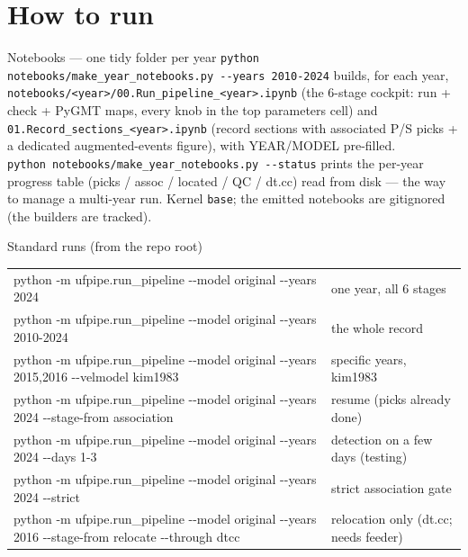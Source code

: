 \documentclass[11pt]{article}
\newcommand{\code}[1]{\texttt{#1}}
\begin{document}
\section{How to run}

\begin{keybox}{Notebooks --- one tidy folder per year}
\code{python notebooks/make\_year\_notebooks.py -{}-years 2010-2024} builds, for each year,
\code{notebooks/<year>/00.Run\_pipeline\_<year>.ipynb} (the 6-stage cockpit: run + check + PyGMT maps, every
knob in the top parameters cell) and \code{01.Record\_sections\_<year>.ipynb} (record sections with associated
P/S picks + a dedicated augmented-events figure), with YEAR/MODEL pre-filled.\\[1mm]
\code{python notebooks/make\_year\_notebooks.py -{}-status} prints the per-year progress table
(picks / assoc / located / QC / dt.cc) read from disk --- the way to manage a multi-year run.
Kernel \code{base}; the emitted notebooks are gitignored (the builders are tracked).
\end{keybox}

\begin{keybox}{Standard runs (from the repo root)}
\begin{tabular}{@{}>{\ttfamily}p{8.4cm}>{\raggedright\arraybackslash}p{6.2cm}@{}}
python -m ufpipe.run\_pipeline -{}-model original -{}-years 2024 & one year, all 6 stages \\
python -m ufpipe.run\_pipeline -{}-model original -{}-years 2010-2024 & the whole record \\
python -m ufpipe.run\_pipeline -{}-model original -{}-years 2015,2016 -{}-velmodel kim1983 & specific years, kim1983 \\
python -m ufpipe.run\_pipeline -{}-model original -{}-years 2024 -{}-stage-from association & resume (picks already done) \\
python -m ufpipe.run\_pipeline -{}-model original -{}-years 2024 -{}-days 1-3 & detection on a few days (testing) \\
python -m ufpipe.run\_pipeline -{}-model original -{}-years 2024 -{}-strict & strict association gate \\
python -m ufpipe.run\_pipeline -{}-model original -{}-years 2016 -{}-stage-from relocate -{}-through dtcc & relocation only (dt.cc; needs feeder) \\
\end{tabular}
\end{keybox}
\end{document}
